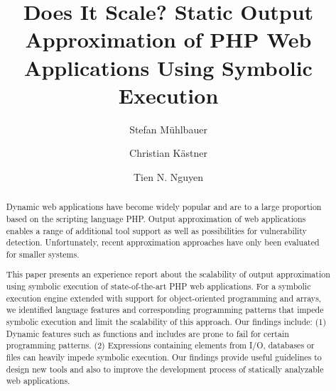 \documentclass[sigconf]{acmart}
\begin{document}
\title{Does It Scale? Static Output Approximation of PHP Web Applications Using
Symbolic Execution}


\author{Stefan Mühlbauer}

\author{Christian Kästner}

\author{Tien N. Nguyen}


\renewcommand{\shortauthors}{S. Mühlbauer et al.}


\begin{abstract}
Dynamic web applications have become widely popular and are to
a large proportion based on the scripting language PHP. Output approximation of web
applications enables a range of additional tool support as well as possibilities
for vulnerability detection. Unfortunately, recent approximation approaches have
only been evaluated for smaller systems.

This paper presents an experience report about the scalability of output
approximation using symbolic execution of state-of-the-art PHP web
applications. For a symbolic execution engine extended with support for
object-oriented programming and arrays, we identified language features and
corresponding programming patterns that impede symbolic execution and limit the
scalability of this approach. Our findings include: (1) Dynamic features such as
functions and includes are prone to fail for certain programming patterns. (2)
Expressions containing elements from I/O, databases or files can heavily impede
symbolic execution. Our findings provide useful guidelines to design new
tools and also to improve the development process of statically analyzable web
applications.
\end{abstract}
\end{document}
